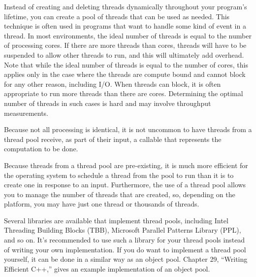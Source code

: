 Instead of creating and deleting threads dynamically throughout your program’s lifetime, you can create a pool of threads that can be used as needed. This technique is often used in programs that want to handle some kind of event in a thread. In most environments, the ideal number of threads is equal to the number of processing cores. If there are more threads than cores, threads will have to be suspended to allow other threads to run, and this will ultimately add overhead. Note that while the ideal number of threads is equal to the number of cores, this applies only in the case where the threads are compute bound and cannot block for any other reason, including I/O. When threads can block, it is often appropriate to run more threads than there are cores. Determining the optimal number of threads in such cases is hard and may involve throughput measurements.

Because not all processing is identical, it is not uncommon to have threads from a thread pool receive, as part of their input, a callable that represents the computation to be done.

Because threads from a thread pool are pre-existing, it is much more efficient for the operating system to schedule a thread from the pool to run than it is to create one in response to an input. Furthermore, the use of a thread pool allows you to manage the number of threads that are created, so, depending on the platform, you may have just one thread or thousands of threads.

Several libraries are available that implement thread pools, including Intel Threading Building Blocks (TBB), Microsoft Parallel Patterns Library (PPL), and so on. It’s recommended to use such a library for your thread pools instead of writing your own implementation. If you do want to implement a thread pool yourself, it can be done in a similar way as an object pool. Chapter 29, “Writing Efficient C++,” gives an example implementation of an object pool.























